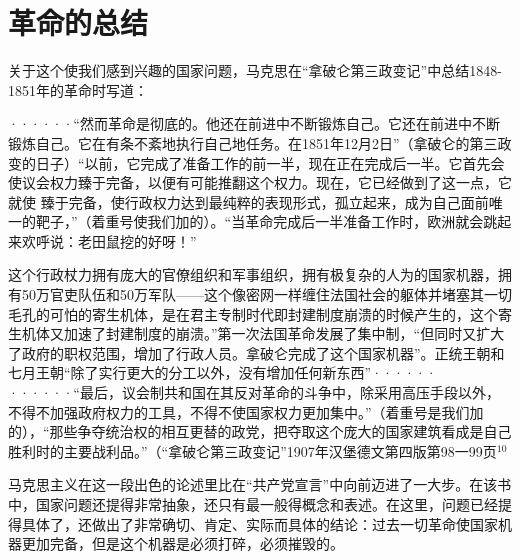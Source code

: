 \chapter{革命的总结} %

关于这个使我们感到兴趣的国家问题，马克思在“拿破仑第三政变记”中总结1848-1851年的革命时写道：

\pskip
\leftskip=10mm
\small

······“然而革命是彻底的。他还在前进中不断锻炼自己。它还在前进中不断锻炼自己。它在有条不紊地执行自己地任务。在1851年12月2日”（拿破仑的第三政变的日子）“以前，它完成了准备工作的前一半，现在正在完成后一半。它首先会使议会权力臻于完备，以便有可能推翻这个权力。现在，它已经做到了这一点，它就使 臻于完备，使行政权力达到最纯粹的表现形式，孤立起来，成为自己面前唯一的靶子，”（着重号使我们加的）。“当革命完成后一半准备工作时，欧洲就会跳起来欢呼说：老田鼠挖的好呀！”

这个行政杖力拥有庞大的官僚组织和军事组织，拥有极复杂的人为的国家机器，拥有50万官吏队伍和50万军队——这个像密网一样缠住法国社会的躯体并堵塞其一切毛孔的可怕的寄生机体，是在君主专制时代即封建制度崩溃的时候产生的，这个寄生机体又加速了封建制度的崩溃。”第一次法国革命发展了集中制，“但同时又扩大了政府的职权范围，增加了行政人员。拿破仑完成了这个国家机器”。正统王朝和七月王朝“除了实行更大的分工以外，没有增加任何新东西”······
······“最后，议会制共和国在其反对革命的斗争中，除采用高压手段以外，不得不加强政府权力的工具，不得不使国家权力更加集中。”（着重号是我们加的），“那些争夺统治权的相互更替的政党，把夺取这个庞大的国家建筑看成是自己胜利时的主要战利品。”（“拿破仑第三政变记”1907年汉堡德文第四版第98一99页$^{10}$

\leftskip=0mm
\normalsize
\pskip

马克思主义在这一段出色的论述里比在“共产党宣言”中向前迈进了一大步。在该书中，国家问题还提得非常抽象，还只有最一般得概念和表述。在这里，问题已经提得具体了，还做出了非常确切、肯定、实际而具体的结论：{\heiti 过去一切革命使国家机器更加完备，但是这个机器是必须打碎，必须摧毁的}。

